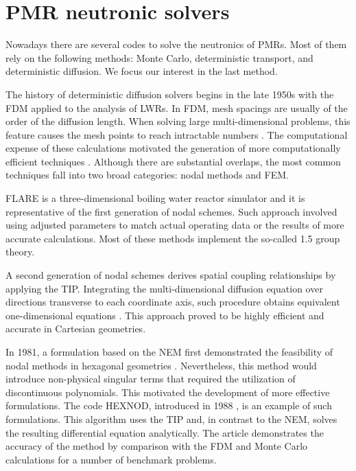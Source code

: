 \documentclass[11pt,letterpaper]{article}
\begin{document}
\section{\gls{PMR} neutronic solvers}

Nowadays there are several codes to solve the neutronics of \glspl{PMR}.
Most of them rely on the following methods: Monte Carlo, deterministic transport, and deterministic diffusion.
We focus our interest in the last method.

The history of deterministic diffusion solvers begins in the late 1950s with the \gls{FDM} applied to the analysis of \glspl{LWR}.
In \gls{FDM}, mesh spacings are usually of the order of the diffusion length.
When solving large multi-dimensional problems, this feature causes the mesh points to reach intractable numbers \cite{lewis_finite_1986}.
The computational expense of these calculations motivated the generation of more computationally efficient techniques \cite{lawrence_progress_1986}.
Although there are substantial overlaps, the most common techniques fall into two broad categories: nodal methods and \gls{FEM}.

FLARE \cite{delp_flare_1964} is a three-dimensional boiling water reactor simulator and it is representative of the first generation of nodal schemes.
Such approach involved using adjusted parameters to match actual operating data or the results of more accurate calculations. 
Most of these methods implement the so-called 1.5 group theory.

A second generation of nodal schemes derives spatial coupling relationships by applying the \gls{TIP}.
Integrating the multi-dimensional diffusion equation over directions transverse to each coordinate axis, such procedure obtains equivalent one-dimensional equations \cite{lawrence_progress_1986}.
This approach proved to be highly efficient and accurate in Cartesian geometries.

In 1981, a formulation based on the \gls{NEM} first demonstrated the feasibility of nodal methods in hexagonal geometries \cite{duracz_nodal_1981}.
Nevertheless, this method would introduce non-physical singular terms that required the utilization of discontinuous polynomials.
This motivated the development of more effective formulations.
The code HEXNOD, introduced in 1988 \cite{wagner_three-dimensional_1989}, is an example of such formulations.
This algorithm uses the \gls{TIP} and, in contrast to the \gls{NEM}, solves the resulting differential equation analytically.
The article demonstrates the accuracy of the method by comparison with the \gls{FDM} and Monte Carlo calculations for a number of benchmark problems.
\end{document}
